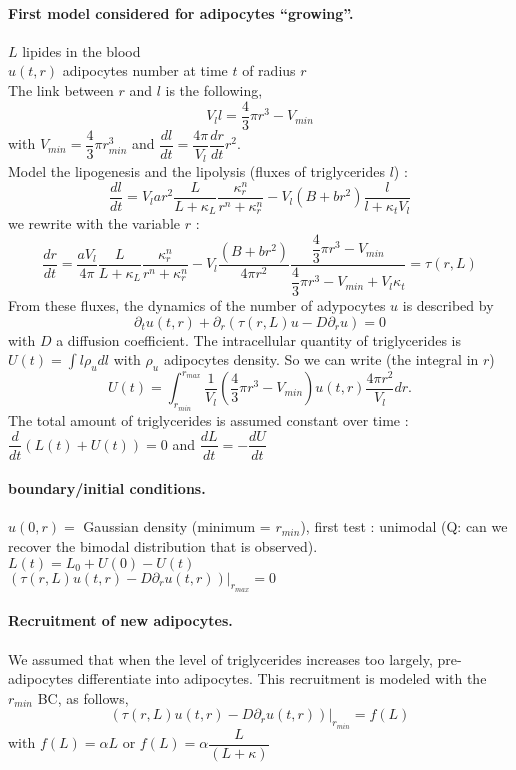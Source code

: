 \documentclass[11pt,a4paper]{article}
\begin{document}
\paragraph{First model considered for adipocytes ``growing''.\\}
$L$ lipides in the blood\\
$u(t,r)$ adipocytes number at time $t$ of radius $r$\\
The link between $r$ and $l$ is the following,
$$V_l l = \dfrac{4}{3} \pi r^3 - V_{min}$$
with $V_{min} = \dfrac{4}{3} \pi r_{min}^3$ and $\dfrac{dl}{dt} = \dfrac{4\pi}{V_l} \dfrac{dr}{dt} r^2$.\\

Model the lipogenesis and the lipolysis (fluxes of triglycerides $l$) : 
$$\dfrac{dl}{dt} = V_l a r^2 \dfrac{L}{L + \kappa_L} \dfrac{\kappa_r^n}{r^n+\kappa_r^n} - V_l (B + br^2) \dfrac{l}{l + \kappa_t V_l}$$
we rewrite with the variable $r$ : 
$$\dfrac{dr}{dt} = \dfrac{aV_l}{4\pi}  \dfrac{L}{L + \kappa_L} \dfrac{\kappa_r^n}{r^n+\kappa_r^n} - V_l \dfrac{(B + br^2)}{4\pi r^2} \dfrac{\dfrac{4}{3} \pi r^3 - V_{min}}{\dfrac{4}{3} \pi r^3 - V_{min} + V_l\kappa_t} = \tau(r, L)$$
From these fluxes, the dynamics of the number of adypocytes $u$ is described by 
$$\partial_t u(t, r) + \partial_r( \tau(r, L) u - D \partial_r u) = 0$$
with $D$ a diffusion coefficient.
The intracellular quantity of triglycerides is $U(t) = \displaystyle \int l \rho_u dl$ with $\rho_u$ adipocytes density. So we can write (the integral in $r$) $$U(t) =  \displaystyle \int_{r_{min}}^{r_{max}} \dfrac{1}{V_l}(\dfrac{4}{3} \pi r^3 - V_{min})u(t,r) \dfrac{4\pi r^ 2}{V_l} dr.$$
The total amount of triglycerides is assumed constant over time : $\dfrac{d}{dt}(L(t) + U(t)) = 0$ and $\dfrac{dL}{dt} = -\dfrac{dU}{dt}$
 
\paragraph{boundary/initial conditions.}
$u(0, r) =$ Gaussian density (minimum = $r_{min}$), first test : unimodal (Q: can we recover the bimodal distribution that is observed).\\
$L(t) = L_0 + U(0) - U(t)$\\
$(\tau(r, L) u(t,r) - D \partial_r u(t,r)) |_{r_{max}} = 0$
\paragraph{Recruitment of new adipocytes.} We assumed that when the level of triglycerides increases too largely, pre-adipocytes differentiate into adipocytes. This recruitment is modeled with the $r_{min}$ BC, as follows,
$$(\tau(r, L) u(t,r) - D \partial_r u(t,r)) |_{r_{min}}= f(L)$$ with $f(L) = \alpha L$ or $f(L) = \alpha \dfrac{L}{(L+\kappa)}$ 
\end{document}
